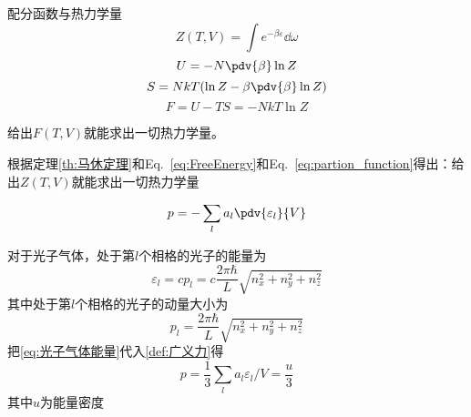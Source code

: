 配分函数与热力学量
\begin{equation}
  Z(T,V) = \int e^{-\beta \varepsilon} \dd{\omega} 
  \label{eq:partion_function}
\end{equation}
\begin{equation*}
  U = - N \pdv{\beta} \ln Z
\end{equation*}
\begin{equation*}
  S  = N k T ( \ln Z - \beta \pdv{\beta} \ln Z )
\end{equation*}
\begin{equation}
  F = U -TS = - NkT \ln Z
  \label{eq:FreeEnergy}
\end{equation}
\begin{theorem}[马休定理]
  给出\(F(T,V)\)就能求出一切热力学量。
  \label{th:马休定理}
\end{theorem}
根据定理\ref{th:马休定理}和Eq.~\eqref{eq:FreeEnergy}和Eq.~\eqref{eq:partion_function}得出：给出\(Z(T,V)\)就能求出一切热力学量

\begin{definition}[广义力]
  \begin{equation}
  p = - \sum_l a_l \pdv{\varepsilon_l}{V}
  \end{equation}
  \label{def:广义力}
\end{definition}
对于光子气体，处于第\(l\)个相格的光子的能量为
\begin{equation}
  \varepsilon_l  = c p_l = c \frac{2\pi \hbar}{L} \sqrt{n_x^2 + n_y^2 + n_z^2}
  \label{eq:光子气体能量}
\end{equation}
其中处于第\(l\)个相格的光子的动量大小为
\begin{equation*}
p_l = \frac{2\pi \hbar}{L} \sqrt{n_x^2 + n_y^2 + n_z^2}
\end{equation*}
把\cref{eq:光子气体能量}代入\cref{def:广义力}得
\begin{equation}
  p = \frac{1}{3} \sum_l a_l \varepsilon_l / V = \frac{u}{3}
\end{equation}
其中\(u\)为能量密度

